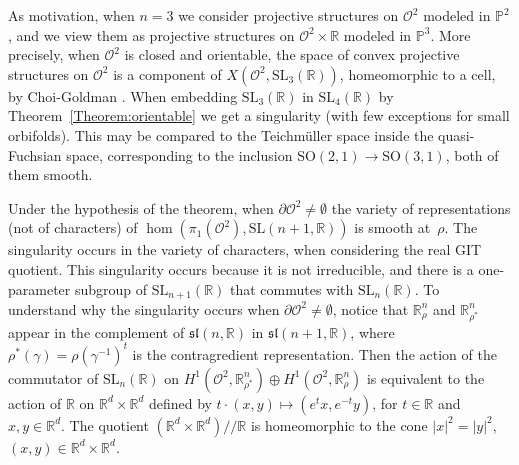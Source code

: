 \documentclass[a4paper,11pt]{article}
\begin{document}
 \medskip
 
 
 


As motivation, when $n=3$ we consider projective structures on $\mathcal O^2$ modeled in $\mathbb P^2$,
and we view them as projective structures on $\mathcal O^2\times\mathbb R$ modeled in $\mathbb P^3$.
More precisely, when $\mathcal O^2$ is closed and orientable, 
the space of convex projective structures on $\mathcal O^2$ is a 
component of 
$X( \mathcal O^2, \mathrm{SL}_3(\mathbb R))$, homeomorphic to a 
cell, by Choi-Goldman \cite{ChoiGoldman}. When embedding $\mathrm{SL}_3(\mathbb R)$ in
$\mathrm{SL}_4(\mathbb R)$ by  Theorem~\ref{Theorem:orientable} we get a singularity
(with few exceptions for small orbifolds). 
This may be compared to the Teichm\"uller space inside the quasi-Fuchsian space,
corresponding to the inclusion $\textrm{SO}(2,1) \to \textrm{SO}(3,1)$, both of
them
smooth.
 


 \medskip
 

 
Under the hypothesis of the theorem, when $\partial\mathcal O^2\neq\emptyset $
the variety of representations (not of characters) of
$\hom(\pi_1(\mathcal O^2), \mathrm{SL}(n+ 1,\mathbb R)) $ is smooth at~$\rho$.
The singularity occurs
in the variety of characters, when considering the real GIT quotient.
This singularity occurs because it is not irreducible, and
there is a one-parameter subgroup of $\mathrm{SL}_{n+1}(\mathbb R)$
that commutes with $\mathrm{SL}_{n}(\mathbb R)$. 
% 
To understand why the singularity occurs when $\partial\mathcal O^2\neq\emptyset $, notice that 
$\mathbb R^n_\rho$ and $\mathbb R^n_{\rho^*}$  appear in the complement of
$\mathfrak{sl}(n,\mathbb R)$ in $\mathfrak{sl}(n+1,\mathbb R)$,
where 
$\rho^*(\gamma)=\rho(\gamma^{-1})^t$ is the contragredient representation. 
Then the action of the commutator of $\mathrm{SL}_{n}(\mathbb R)$ on 
$H^1(\mathcal O^2,\mathbb R^n_{\rho^*})\oplus H^1(\mathcal O^2,\mathbb R^n_\rho)$
is equivalent to the action of 
$\mathbb R$ on  $\mathbb R^d\times\mathbb R^d$
defined by 
$t\cdot (x,y)\mapsto (e^t x, e^{-t} y)$, for $t\in \mathbb R$ and $x, y\in \mathbb R^d$.
The quotient   $(\mathbb R^d\times\mathbb R^d)/\!/ \mathbb R $ is homeomorphic to 
the cone $|x|^2=|y|^2$, 
$(x,y)\in \mathbb R^d\times\mathbb R^d$.
 
\end{document}
